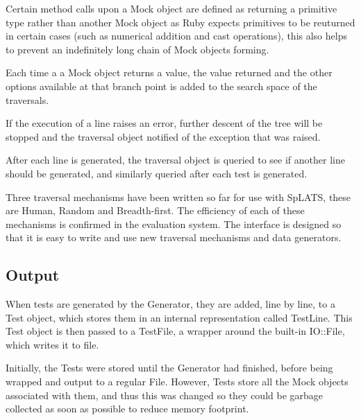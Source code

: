    Certain method calls upon a Mock object are defined as returning a primitive
type rather than another Mock object as Ruby expects primitives to be reuturned
in certain cases (such as numerical addition and cast operations), this also
helps to prevent an indefinitely long chain of Mock objects forming.

    Each time a a Mock object returns a value, the value returned and the other
options available at that branch point is added to the search space of the
traversals.

    If the execution of a line raises an error, further descent of the tree will
be stopped and the traversal object notified of the exception that was raised.

    After each line is generated, the traversal object is queried to see if
another line should be generated, and similarly queried after each test is
generated.

    Three traversal mechanisms have been written so far for use with SpLATS, these
are Human, Random and Breadth-first. The efficiency of each of these mechanisms
is confirmed in the evaluation system. The interface is designed so that it is
easy to write and use new traversal mechanisms and data generators.

  \subsection{Output}
    When tests are generated by the Generator, they are added, line by line, to a Test object, which stores them in an internal representation called TestLine.
    This Test object is then passed to a TestFile, a wrapper around the built-in IO::File, which writes it to file.

    Initially, the Tests were stored until the Generator had finished, before being wrapped and output to a regular File.
    However, Tests store all the Mock objects associated with them, and thus this was changed so they could be garbage collected as soon as possible to reduce memory footprint.
    
    

